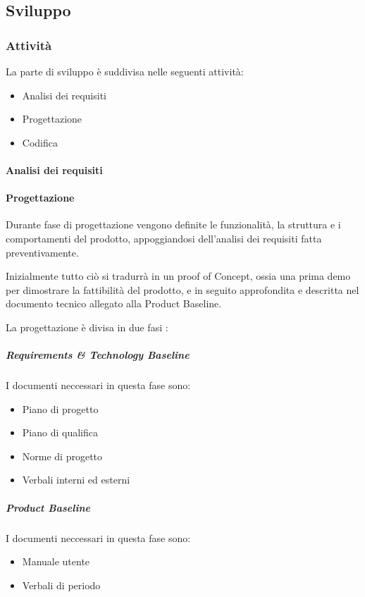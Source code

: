 \documentclass[12pt]{article}
\begin{document}
\subsection{Sviluppo}
\subsubsection{Attività}
La parte di sviluppo è suddivisa nelle seguenti attività:

\begin{itemize}
    \item Analisi dei requisiti
    \item Progettazione
    \item Codifica
\end{itemize}

\paragraph{Analisi dei requisiti}

\paragraph{Progettazione}
Durante fase di progettazione vengono definite le funzionalità, la struttura e i comportamenti del prodotto, appoggiandosi dell'analisi dei requisiti fatta preventivamente.

Inizialmente tutto ciò si tradurrà in un proof of Concept, ossia una prima demo per dimostrare la fattibilità del prodotto, e in seguito approfondita e descritta nel documento tecnico allegato alla Product Baseline.

La progettazione è divisa in due fasi :

\subparagraph{Requirements \& Technology Baseline}
I documenti neccessari in questa fase sono:
\begin{itemize}
    \item Piano di progetto
    \item Piano di qualifica
    \item Norme di progetto
    \item Verbali interni ed esterni
\end{itemize}

\subparagraph{Product Baseline}
I documenti neccessari in questa fase sono:
\begin{itemize}
    \item Manuale utente
    \item Verbali di periodo
\end{itemize}
\end{document}

